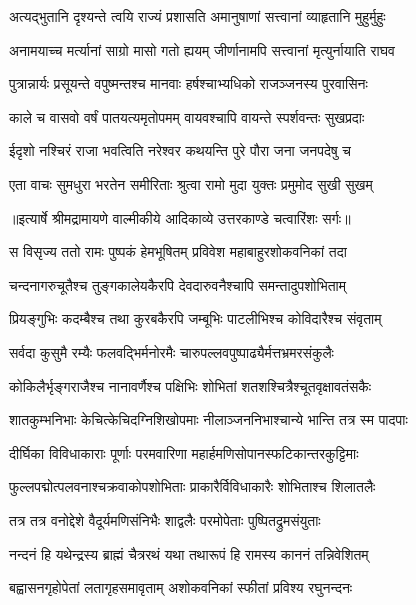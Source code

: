 \twolineshloka
{अत्यद्भुतानि दृश्यन्ते त्वयि राज्यं प्रशासति}
{अमानुषाणां सत्त्वानां व्याहृतानि मुहुर्मुहुः} %

\twolineshloka
{अनामयाच्च मर्त्यानां साग्रो मासो गतो ह्ययम्}
{जीर्णानामपि सत्त्वानां मृत्युर्नायाति राघव} %

\twolineshloka
{पुत्रान्नार्यः प्रसूयन्ते वपुष्मन्तश्च मानवाः}
{हर्षश्चाभ्यधिको राजञ्जनस्य पुरवासिनः} %

\twolineshloka
{काले च वासवो वर्षं पातयत्यमृतोपमम्}
{वायवश्चापि वायन्ते स्पर्शवन्तः सुखप्रदाः} %

\twolineshloka
{ईदृशो नश्चिरं राजा भवत्विति नरेश्वर}
{कथयन्ति पुरे पौरा जना जनपदेषु च} %

\twolineshloka
{एता वाचः सुमधुरा भरतेन समीरिताः}
{श्रुत्वा रामो मुदा युक्तः प्रमुमोद सुखी सुखम्} %


{॥इत्यार्षे श्रीमद्रामायणे वाल्मीकीये आदिकाव्ये उत्तरकाण्डे चत्वारिंशः सर्गः॥}


\twolineshloka
{स विसृज्य ततो रामः पुष्पकं हेमभूषितम्}
{प्रविवेश महाबाहुरशोकवनिकां तदा} %

\twolineshloka
{चन्दनागरुचूतैश्च तुङ्गकालेयकैरपि}
{देवदारुवनैश्चापि समन्तादुपशोभिताम्} %

\twolineshloka
{प्रियङ्गुभिः कदम्बैश्च तथा कुरबकैरपि}
{जम्बूभिः पाटलीभिश्च कोविदारैश्च संवृताम्} %

\twolineshloka
{सर्वदा कुसुमै रम्यैः फलवद्भिर्मनोरमैः}
{चारुपल्लवपुष्पाढ्यैर्मत्तभ्रमरसंकुलैः} %

\twolineshloka
{कोकिलैर्भृङ्गराजैश्च नानावर्णैश्च पक्षिभिः}
{शोभितां शतशश्चित्रैश्चूतवृक्षावतंसकैः} %

\twolineshloka
{शातकुम्भनिभाः केचित्केचिदग्निशिखोपमाः}
{नीलाञ्जननिभाश्चान्ये भान्ति तत्र स्म पादपाः} %

\twolineshloka
{दीर्घिका विविधाकाराः पूर्णाः परमवारिणा}
{महार्हमणिसोपानस्फटिकान्तरकुट्टिमाः} %

\twolineshloka
{फुल्लपद्मोत्पलवनाश्चक्रवाकोपशोभिताः}
{प्राकारैर्विविधाकारैः शोभिताश्च शिलातलैः} %

\twolineshloka
{तत्र तत्र वनोद्देशे वैदूर्यमणिसंनिभैः}
{शाद्वलैः परमोपेताः पुष्पितद्रुमसंयुताः} %

\twolineshloka
{नन्दनं हि यथेन्द्रस्य ब्राह्मं चैत्ररथं यथा}
{तथारूपं हि रामस्य काननं तन्निवेशितम्} %

\twolineshloka
{बह्वासनगृहोपेतां लतागृहसमावृताम्}
{अशोकवनिकां स्फीतां प्रविश्य रघुनन्दनः} %

